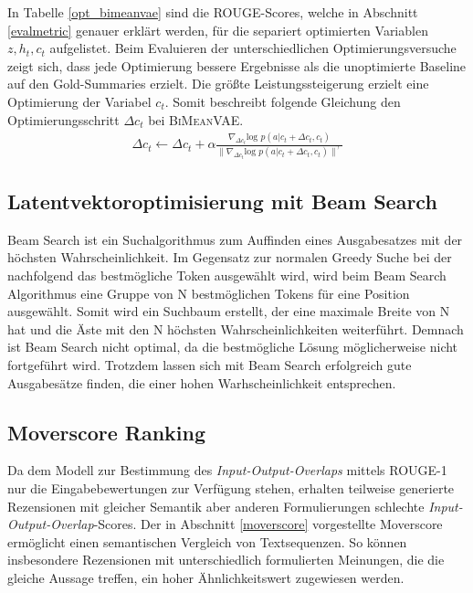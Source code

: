 In Tabelle \ref{opt_bimeanvae} sind die ROUGE-Scores, welche in Abschnitt \ref*{evalmetric} genauer erklärt werden, für die separiert optimierten Variablen $z, h_t, c_t$ aufgelistet.
Beim Evaluieren der unterschiedlichen Optimierungsversuche zeigt sich, dass jede Optimierung bessere Ergebnisse als die unoptimierte Baseline auf den Gold-Summaries erzielt.
Die größte Leistungssteigerung erzielt eine Optimierung der Variabel $c_t$.
Somit beschreibt folgende Gleichung den Optimierungsschritt $\Delta c_t$ bei \textsc{BiMeanVAE}.
\begin{align*}
    \Delta c_t \leftarrow \Delta c_t + \alpha \frac{\nabla_{\Delta c_t} \text{log }p(a|c_t+\Delta c_t,c_t)}{\| \nabla_{\Delta c_t} \text{log }p(a|c_t +\Delta c_t ,c_t )\|^\gamma}
\end{align*}




\subsection{Latentvektoroptimisierung mit Beam Search}
Beam Search ist ein Suchalgorithmus zum Auffinden eines Ausgabesatzes mit der höchsten Wahrscheinlichkeit. 
Im Gegensatz zur normalen Greedy Suche bei der nachfolgend das bestmögliche Token ausgewählt wird, wird beim Beam Search Algorithmus eine Gruppe von N bestmöglichen Tokens für eine Position ausgewählt. 
Somit wird ein Suchbaum erstellt, der eine maximale Breite von N hat und die Äste mit den N höchsten Wahrscheinlichkeiten weiterführt. 
Demnach ist Beam Search nicht optimal, da die bestmögliche Lösung möglicherweise nicht fortgeführt wird. Trotzdem lassen sich mit Beam Search erfolgreich gute Ausgabesätze finden, die einer hohen Warhscheinlichkeit entsprechen.

\subsection{Moverscore Ranking}
\label{moverscore_ranking}
Da dem Modell zur Bestimmung des \textit{Input-Output-Overlaps} mittels ROUGE-1 nur die Eingabebewertungen zur Verfügung stehen, erhalten teilweise generierte Rezensionen mit gleicher Semantik aber anderen Formulierungen schlechte  \textit{Input-Output-Overlap}-Scores.
Der in Abschnitt \ref{moverscore} vorgestellte Moverscore ermöglicht einen semantischen Vergleich von Textsequenzen. 
So können insbesondere Rezensionen mit unterschiedlich formulierten Meinungen, die die gleiche Aussage treffen, ein hoher Ähnlichkeitswert zugewiesen werden.

